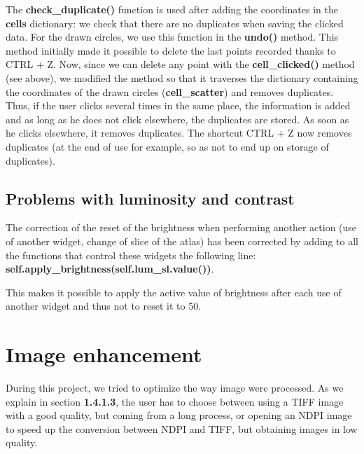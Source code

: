 \documentclass[a4paper,12pt]{report}
\begin{document}
The \textbf{check\_duplicate()} function is used after adding the coordinates in the \textbf{cells} dictionary: we check that there are no duplicates when saving the clicked data. For the drawn circles, we use this function in the \textbf{undo()} method. This method initially made it possible to delete the last points recorded thanks to CTRL + Z. Now, since we can delete any point with the \textbf{cell\_clicked()} method (see above), we modified the method so that it traverses the dictionary containing the coordinates of the drawn circles (\textbf{cell\_scatter}) and removes duplicates. Thus, if the user clicks several times in the same place, the information is added and as long as he does not click elsewhere, the duplicates are stored. As soon as he clicks elsewhere, it removes duplicates. The shortcut CTRL + Z now removes duplicates (at the end of use for example, so as not to end up on storage of duplicates).\\

\subsection{Problems with luminosity and contrast}
The correction of the reset of the brightness when performing another action (use of another widget, change of slice of the atlas) has been corrected by adding to all the functions that control these widgets the following line: \textbf{self.apply\_brightness(self.lum\_sl.value())}.

This makes it possible to apply the active value of brightness after each use of another widget and thus not to reset it to 50.\\


\section{Image enhancement}
During this project, we tried to optimize the way image were processed. As we explain in section \textbf{1.4.1.3}, the user has to choose between using a TIFF image with a good quality, but coming from a long process, or opening an NDPI image to speed up the conversion between NDPI and TIFF, but obtaining images in low quality.\\
\end{document}
